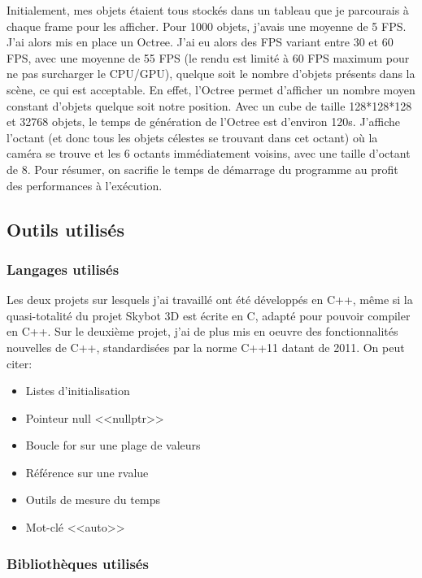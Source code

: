\documentclass[a4paper,french,12pt]{article}
\begin{document}
		
		Initialement, mes objets étaient tous stockés dans un tableau que je parcourais à chaque frame pour les afficher.
		Pour 1000 objets, j'avais une moyenne de 5 FPS. 
		J'ai alors mis en place un Octree. J'ai eu alors des FPS variant entre 30 et 60 FPS, avec une moyenne de 55 FPS
		(le rendu est limité à 60 FPS maximum
		pour ne pas surcharger le CPU/GPU), quelque soit le nombre d'objets présents dans la scène, ce qui est acceptable.
		En effet, l'Octree permet d'afficher un nombre moyen constant d'objets quelque soit notre position.
		Avec un cube de taille 128*128*128 et 32768 objets, le temps de génération de l'Octree est d'environ 120s.
		J'affiche l'octant (et donc tous les objets célestes se trouvant dans cet octant) où la caméra se trouve
		et les 6 octants immédiatement voisins, avec une taille d'octant de 8.
		Pour résumer, on sacrifie le temps de démarrage du programme au profit des performances à l'exécution.


	\subsection{Outils utilisés}

		\subsubsection{Langages utilisés}
		    Les deux projets sur lesquels j'ai travaillé ont été développés en C++, même si la quasi-totalité 
		    du projet Skybot 3D est écrite en C, adapté pour pouvoir compiler en C++.
		    Sur le deuxième projet, j'ai de plus mis en oeuvre des fonctionnalités nouvelles de C++, standardisées
		    par la norme C++11 datant de 2011. On peut citer:
		    \begin{itemize}
		     \item Listes d'initialisation 
		     \item Pointeur null <<nullptr>>
		     \item Boucle for sur une plage de valeurs
		     \item Référence sur une rvalue
		     \item Outils de mesure du temps
		     \item Mot-clé <<auto>>
		    \end{itemize}
	
		\subsubsection{Bibliothèques utilisés}
\end{document}
